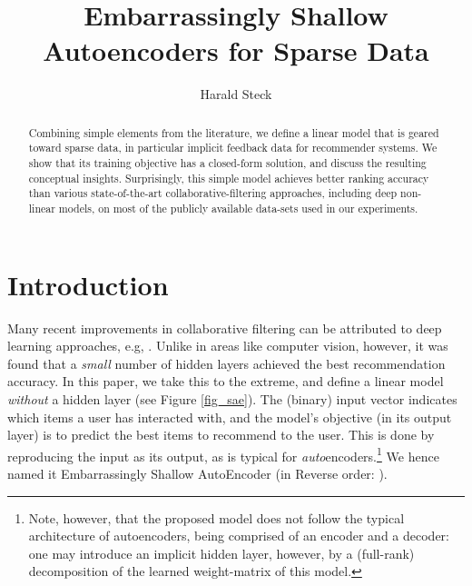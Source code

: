 \documentclass[sigconf]{acmart}
\newcommand{\sae}{}
\begin{document}
\title{Embarrassingly Shallow Autoencoders for Sparse Data}

\author{Harald Steck}


\begin{abstract}
Combining simple elements from the literature, we define a linear model that is geared toward  sparse data, in particular implicit feedback data for recommender systems. We show that its training objective has a closed-form solution, and discuss the resulting conceptual insights.  Surprisingly, this simple  model  achieves better ranking accuracy than  various state-of-the-art collaborative-filtering approaches, including deep non-linear models,  on most of the publicly available data-sets used in our experiments. 
\end{abstract}

 


\maketitle


\section{Introduction}
Many recent improvements in  collaborative filtering can be attributed to deep learning approaches, e.g, \cite{hidasi15,hidasi17,liang18,sedhain15, zheng16,wu16,he17,cheng16}. Unlike in areas like  computer vision, however, it was found that a  \emph{small} number of hidden layers achieved the best recommendation accuracy. In this paper, we take this to the extreme, and define a linear model \emph{without}  a hidden layer (see Figure \ref{fig_sae}). The (binary) input vector indicates which items a user has interacted with, and the model's objective (in its output layer) is to predict  the best items to recommend to the user. This is done by reproducing the input as its output, as is typical for  \emph{auto}encoders.\footnote{Note, however, that the proposed model  does not follow the typical architecture of autoencoders, being comprised of an encoder and a decoder: one may introduce an implicit  hidden layer, however, by a (full-rank) decomposition of the learned weight-matrix of this model.}
 We hence  named it Embarrassingly Shallow AutoEncoder (in Reverse order: \sae{}).
\end{document}
